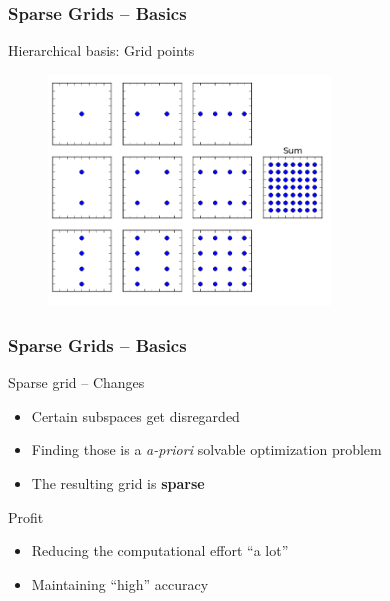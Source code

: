 \begin{frame}
  \frametitle{Sparse Grids -- Basics}
  \topline
  \vspace{-10px}
  \begin{block}{Hierarchical basis: Grid points}
    \begin{figure}[!htp]
      \centering
      \includegraphics[width=7.5cm]{images/sparsegrid_hirach1}
      \vspace{-12px}
      \caption{}
    \end{figure}
  \end{block}
\end{frame}
\begin{frame}
  \frametitle{Sparse Grids -- Basics}
  \topline
  \vspace{-10px}
  \begin{block}{Sparse grid -- Changes}
    \begin{itemize}
      \item Certain subspaces get disregarded
      \item Finding those is a \emph{a-priori} solvable optimization problem
      \item The resulting grid is \textbf{sparse}
      \end{itemize}
  \end{block}
  \begin{block}{Profit}
    \begin{itemize}
      \item Reducing the computational effort ``a lot''
      \item Maintaining ``high'' accuracy
      \end{itemize}
  \end{block}
\end{frame}

